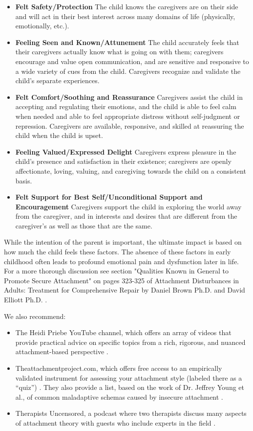 \documentclass[12pt,letterpaper]{book}
\begin{document}
\begin{itemize}
    \item \textbf{Felt Safety/Protection} The child knows the caregivers are on their side and will act in their best interest across many domains of life (physically, emotionally, etc.).
    \item \textbf{Feeling Seen and Known/Attunement} The child accurately feels that their caregivers actually know what is going on with them; caregivers encourage and value open communication, and are sensitive and responsive to a wide variety of cues from the child. Caregivers recognize and validate the child's separate experiences.
    \item \textbf{Felt Comfort/Soothing and Reassurance} Caregivers assist the child in accepting and regulating their emotions, and the child is able to feel calm when needed and able to feel appropriate distress without self-judgment or repression. Caregivers are available, responsive, and skilled at reassuring the child when the child is upset.
    \item \textbf{Feeling Valued/Expressed Delight} Caregivers express pleasure in the child's presence and satisfaction in their existence; caregivers are openly affectionate, loving, valuing, and caregiving towards the child on a consistent basis.
    \item \textbf{Felt Support for Best Self/Unconditional Support and Encouragement} Caregivers support the child in exploring the world away from the caregiver, and in interests and desires that are different from the caregiver's as well as those that are the same.
\end{itemize}

While the intention of the parent is important, the ultimate impact is based on how much the child feels these factors. The absence of these factors in early childhood often leads to profound emotional pain and dysfunction later in life. For a more thorough discussion see section "Qualities Known in General to Promote Secure Attachment" on pages 323-325 of Attachment Disturbances in Adults: Treatment for Comprehensive Repair by Daniel Brown Ph.D. and David Elliott Ph.D. \cite{brownAttachmentDisturbances}.

We also recommend:
\begin{itemize}
    \item The Heidi Priebe YouTube channel, which offers an array of videos that provide practical advice on specific topics from a rich, rigorous, and nuanced attachment-based perspective \cite{priebeYoutube}.
    \item Theattachmentproject.com, which offers free access to an empirically validated instrument for assessing your attachment style (labeled there as a “quiz”) \cite{attachmentProject}. They also provide a list, based on the work of Dr. Jeffrey Young et al., of common maladaptive schemas caused by insecure attachment \cite{earlyMalSchemas}.
    \item Therapists Uncensored, a podcast where two therapists discuss many aspects of attachment theory with guests who include experts in the field \cite{therapistsUncensored}.
\end{itemize}
\end{document}
